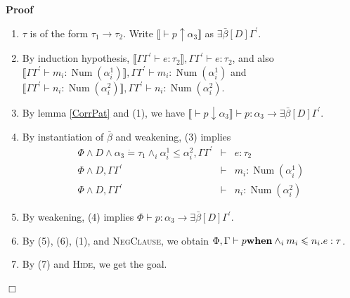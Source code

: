 \documentclass{article}
\newcommand{\tmname}[1]{\textsc{#1}}
\newcommand{\tmop}[1]{\ensuremath{\operatorname{#1}}}
\newcommand{\tmstrong}[1]{\textbf{#1}}
\newenvironment{proof}{\noindent\textbf{Proof\ }}{\hspace*{\fill}$\Box$\medskip}
\begin{document}
\begin{proof}
\begin{itemize}
\begin{enumerate}
      \item $\tau$ is of the form $\tau_1 \rightarrow \tau_2$. Write
      $\llbracket \vdash p \uparrow \alpha_3 \rrbracket$ as $\exists
      \bar{\beta} [D] \Gamma^{\prime}$.
      
      \item By induction hypothesis, $\llbracket \Gamma \Gamma^{\prime} \vdash
      e : \tau_2 \rrbracket, \Gamma \Gamma^{\prime} \vdash e : \tau_2$, and
      also $\llbracket \Gamma \Gamma^{\prime} \vdash m_i : \tmop{Num}
      (\alpha_i^1) \rrbracket, \Gamma \Gamma^{\prime} \vdash m_i : \tmop{Num}
      (\alpha_i^1)$ and $\llbracket \Gamma \Gamma^{\prime} \vdash n_i :
      \tmop{Num} (\alpha_i^2) \rrbracket, \Gamma \Gamma^{\prime} \vdash n_i :
      \tmop{Num} (\alpha_i^2)$.
      
      \item By lemma \ref{CorrPat} and (1), we have $\llbracket \vdash p
      \downarrow \alpha_3 \rrbracket \vdash p : \alpha_3 \longrightarrow
      \exists \bar{\beta} [D] \Gamma^{\prime}$.
      
      \item By instantiation of $\bar{\beta}$ and weakening, (3) implies
      \begin{eqnarray*}
        \Phi \wedge D \wedge \alpha_3 \dot{=} \tau_1 \wedge_i \alpha^1_i \leq
        \alpha^2_i, \Gamma \Gamma^{\prime} & \vdash & e : \tau_2\\
        \Phi \wedge D, \Gamma \Gamma^{\prime} & \vdash & m_i : \tmop{Num}
        (\alpha^1_i)\\
        \Phi \wedge D, \Gamma \Gamma^{\prime} & \vdash & n_i : \tmop{Num}
        (\alpha^2_i)
      \end{eqnarray*}
      \item By weakening, (4) implies $\Phi \vdash p : \alpha_3
      \longrightarrow \exists \bar{\beta} [D] \Gamma^{\prime}$.
      
      \item By (5), (6), (1), and {\tmname{NegClause}}, we obtain $\Phi,
      \Gamma \vdash p \text{{\tmstrong{when}}} \wedge_i m_i \leqslant n_i .e :
      \tau$.
      
      \item By (7) and {\tmname{Hide}}, we get the goal.
    \end{enumerate}
  \end{itemize}
\end{proof}
\end{document}
